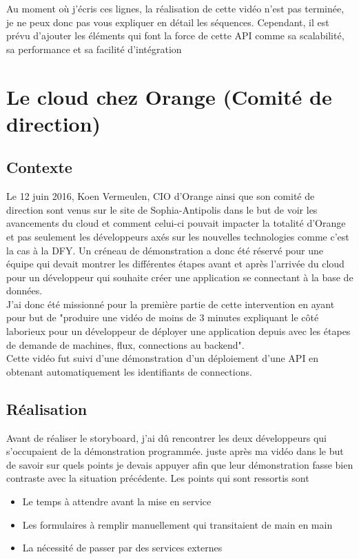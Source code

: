 Au moment où j'écris ces lignes, la réalisation de cette vidéo n'est pas terminée, je ne peux donc pas vous expliquer en détail les séquences. Cependant, il est prévu d'ajouter les éléments qui font la force de cette API comme sa scalabilité, sa performance et sa facilité d'intégration 



\section{Le cloud chez Orange (Comité de direction)}
\subsection{Contexte}
Le 12 juin 2016, Koen Vermeulen, CIO d'Orange ainsi que son comité de direction sont venus sur le site de Sophia-Antipolis dans le but de voir les avancements du cloud et comment celui-ci pouvait impacter la totalité d'Orange et pas seulement les développeurs axés sur les nouvelles technologies comme c'est la cas à la DFY. Un créneau de démonstration a donc été réservé pour une équipe qui devait montrer les différentes étapes avant et après l'arrivée du cloud pour un développeur qui souhaite créer une application se connectant à la base de données.\\

J'ai donc été missionné pour la première partie de cette intervention en ayant pour but de "produire une vidéo de moins de 3 minutes expliquant le côté laborieux pour un développeur de déployer une application depuis avec les étapes de demande de machines, flux, connections au backend".\\

Cette vidéo fut suivi d'une démonstration d'un déploiement d'une API en obtenant automatiquement les identifiants de connections.

\subsection{Réalisation}
Avant de réaliser le storyboard, j'ai dû rencontrer les deux développeurs qui s'occupaient de la démonstration programmée. juste après ma vidéo dans le but de savoir sur quels points je devais appuyer afin que leur démonstration fasse bien contraste avec la situation précédente. Les points qui sont ressortis sont

\begin{itemize}
    \item Le temps à attendre avant la mise en service
    \item Les formulaires à remplir manuellement qui transitaient de main en main
    \item La nécessité de passer par des services externes
\end{itemize}

